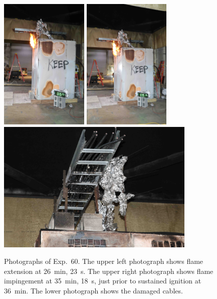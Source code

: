 \begin{figure}[p]
\centering
\includegraphics[height=2.50in,angle=-90]{../FIGURES/Test_60_26_min_23_s} \hspace{0.1in}
\includegraphics[height=2.50in,angle=-90]{../FIGURES/Test_60_35_min_18_s} \\ \vspace{0.1in}
\includegraphics[height=2.50in]{../FIGURES/Test_60_scar}
\caption[Photographs of Exp.~60]{Photographs of Exp.~60. The upper left photograph shows flame extension at 26~min, 23~s. The upper right photograph shows flame impingement at 35~min, 18~s, just prior to sustained ignition at 36~min. The lower photograph shows the damaged cables.}
\label{fig:Test_60_photos}
\end{figure}


